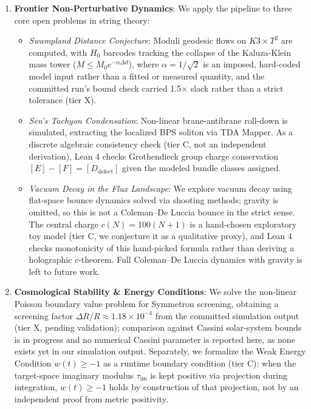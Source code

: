 \documentclass[11pt]{letter}
\providecommand{\numreconcile}[2]{#1}
\begin{document}
\begin{enumerate}
    \item \textbf{Frontier Non-Perturbative Dynamics}: We apply the pipeline to three core open problems in string theory:
    \begin{itemize}
        \item \emph{Swampland Distance Conjecture}: Moduli geodesic flows on $K3 \times T^2$ are computed, with $H_0$ barcodes tracking the collapse of the Kaluza-Klein mass tower ($M \le M_0 e^{-\alpha \Delta d}$), where $\alpha = \numreconcile{1/\sqrt{2}}{alpha}$ is an imposed, hard-coded model input rather than a fitted or measured quantity, and the committed run's bound check carried 1.5$\times$ slack rather than a strict tolerance (tier X).
        \item \emph{Sen's Tachyon Condensation}: Non-linear brane-antibrane roll-down is simulated, extracting the localized BPS soliton via TDA Mapper. As a discrete algebraic consistency check (tier C, not an independent derivation), Lean 4 checks Grothendieck group charge conservation $[E] - [F] = [D_{\text{defect}}]$ given the modeled bundle classes assigned.
        \item \emph{Vacuum Decay in the Flux Landscape}: We explore vacuum decay using flat-space bounce dynamics solved via shooting methods; gravity is omitted, so this is not a Coleman--De Luccia bounce in the strict sense. The central charge $c(N) = 100(N+1)$ is a hand-chosen exploratory toy model (tier C, we conjecture it as a qualitative proxy), and Lean 4 checks monotonicity of this hand-picked formula rather than deriving a holographic $c$-theorem. Full Coleman--De Luccia dynamics with gravity is left to future work.
    \end{itemize}

    \item \textbf{Cosmological Stability \& Energy Conditions}: We solve the non-linear Poisson boundary value problem for Symmetron screening, obtaining a screening factor $\Delta R/R \approx \numreconcile{1.18\times 10^{-4}}{screening\_factor}$ from the committed simulation output (tier X, pending validation); comparison against Cassini solar-system bounds is in progress and no numerical Cassini parameter is reported here, as none exists yet in our simulation output. Separately, we formalize the Weak Energy Condition $w(t) \ge -1$ as a runtime boundary condition (tier C): when the target-space imaginary modulus $\tau_{\text{im}}$ is kept positive via projection during integration, $w(t) \ge -1$ holds by construction of that projection, not by an independent proof from metric positivity.
\end{enumerate}
\end{document}
